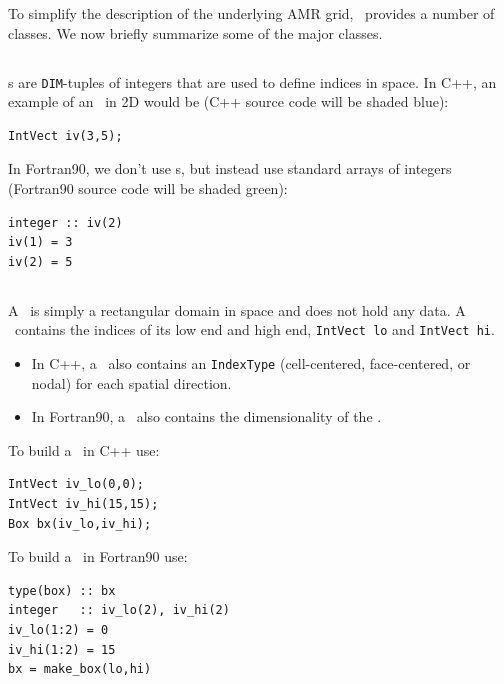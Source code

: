 To simplify the description of the underlying AMR grid, \BoxLib\
provides a number of classes.  We now briefly summarize some of the major
classes.

\subsection{\IntVect}

\IntVect s are {\tt DIM}-tuples of integers that are used to define
indices in space.  In C++, an example of an \IntVect\ in 2D would be
(C++ source code will be shaded blue):
\begin{lstlisting}[backgroundcolor=\color{light-blue}]
IntVect iv(3,5);
\end{lstlisting}
In Fortran90, we don't use \IntVect s, but instead use standard
arrays of integers (Fortran90 source code will be shaded green):
\begin{lstlisting}[backgroundcolor=\color{light-green}]
integer :: iv(2)
iv(1) = 3
iv(2) = 5
\end{lstlisting}

\subsection{\BoxType}

A \BoxType\ is simply a rectangular domain in space and does not hold any data.
A \BoxType\ contains the indices of its low end and high end, 
{\tt IntVect lo} and {\tt IntVect hi}.
\begin{itemize}
\item In C++, a \BoxType\ also
contains an {\tt IndexType} (cell-centered, face-centered, or nodal) for each
spatial direction.
\item In Fortran90, a \BoxType\ also contains the dimensionality 
of the \BoxType.
\end{itemize}
To build a \BoxType\ in C++ use:
\begin{lstlisting}[backgroundcolor=\color{light-blue}]
IntVect iv_lo(0,0);
IntVect iv_hi(15,15);
Box bx(iv_lo,iv_hi);
\end{lstlisting}
To build a \BoxType\ in Fortran90 use:
\begin{lstlisting}[backgroundcolor=\color{light-green}]
type(box) :: bx
integer   :: iv_lo(2), iv_hi(2)
iv_lo(1:2) = 0
iv_hi(1:2) = 15
bx = make_box(lo,hi)
\end{lstlisting}

